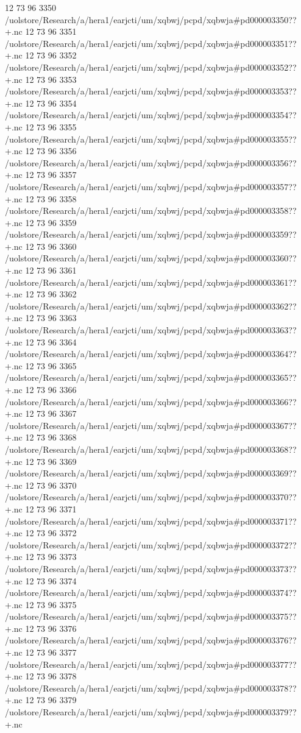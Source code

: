 12 73 96
3350
/uolstore/Research/a/hera1/earjcti/um/xqbwj/pcpd/xqbwja#pd000003350??+.nc
12 73 96
3351
/uolstore/Research/a/hera1/earjcti/um/xqbwj/pcpd/xqbwja#pd000003351??+.nc
12 73 96
3352
/uolstore/Research/a/hera1/earjcti/um/xqbwj/pcpd/xqbwja#pd000003352??+.nc
12 73 96
3353
/uolstore/Research/a/hera1/earjcti/um/xqbwj/pcpd/xqbwja#pd000003353??+.nc
12 73 96
3354
/uolstore/Research/a/hera1/earjcti/um/xqbwj/pcpd/xqbwja#pd000003354??+.nc
12 73 96
3355
/uolstore/Research/a/hera1/earjcti/um/xqbwj/pcpd/xqbwja#pd000003355??+.nc
12 73 96
3356
/uolstore/Research/a/hera1/earjcti/um/xqbwj/pcpd/xqbwja#pd000003356??+.nc
12 73 96
3357
/uolstore/Research/a/hera1/earjcti/um/xqbwj/pcpd/xqbwja#pd000003357??+.nc
12 73 96
3358
/uolstore/Research/a/hera1/earjcti/um/xqbwj/pcpd/xqbwja#pd000003358??+.nc
12 73 96
3359
/uolstore/Research/a/hera1/earjcti/um/xqbwj/pcpd/xqbwja#pd000003359??+.nc
12 73 96
3360
/uolstore/Research/a/hera1/earjcti/um/xqbwj/pcpd/xqbwja#pd000003360??+.nc
12 73 96
3361
/uolstore/Research/a/hera1/earjcti/um/xqbwj/pcpd/xqbwja#pd000003361??+.nc
12 73 96
3362
/uolstore/Research/a/hera1/earjcti/um/xqbwj/pcpd/xqbwja#pd000003362??+.nc
12 73 96
3363
/uolstore/Research/a/hera1/earjcti/um/xqbwj/pcpd/xqbwja#pd000003363??+.nc
12 73 96
3364
/uolstore/Research/a/hera1/earjcti/um/xqbwj/pcpd/xqbwja#pd000003364??+.nc
12 73 96
3365
/uolstore/Research/a/hera1/earjcti/um/xqbwj/pcpd/xqbwja#pd000003365??+.nc
12 73 96
3366
/uolstore/Research/a/hera1/earjcti/um/xqbwj/pcpd/xqbwja#pd000003366??+.nc
12 73 96
3367
/uolstore/Research/a/hera1/earjcti/um/xqbwj/pcpd/xqbwja#pd000003367??+.nc
12 73 96
3368
/uolstore/Research/a/hera1/earjcti/um/xqbwj/pcpd/xqbwja#pd000003368??+.nc
12 73 96
3369
/uolstore/Research/a/hera1/earjcti/um/xqbwj/pcpd/xqbwja#pd000003369??+.nc
12 73 96
3370
/uolstore/Research/a/hera1/earjcti/um/xqbwj/pcpd/xqbwja#pd000003370??+.nc
12 73 96
3371
/uolstore/Research/a/hera1/earjcti/um/xqbwj/pcpd/xqbwja#pd000003371??+.nc
12 73 96
3372
/uolstore/Research/a/hera1/earjcti/um/xqbwj/pcpd/xqbwja#pd000003372??+.nc
12 73 96
3373
/uolstore/Research/a/hera1/earjcti/um/xqbwj/pcpd/xqbwja#pd000003373??+.nc
12 73 96
3374
/uolstore/Research/a/hera1/earjcti/um/xqbwj/pcpd/xqbwja#pd000003374??+.nc
12 73 96
3375
/uolstore/Research/a/hera1/earjcti/um/xqbwj/pcpd/xqbwja#pd000003375??+.nc
12 73 96
3376
/uolstore/Research/a/hera1/earjcti/um/xqbwj/pcpd/xqbwja#pd000003376??+.nc
12 73 96
3377
/uolstore/Research/a/hera1/earjcti/um/xqbwj/pcpd/xqbwja#pd000003377??+.nc
12 73 96
3378
/uolstore/Research/a/hera1/earjcti/um/xqbwj/pcpd/xqbwja#pd000003378??+.nc
12 73 96
3379
/uolstore/Research/a/hera1/earjcti/um/xqbwj/pcpd/xqbwja#pd000003379??+.nc
